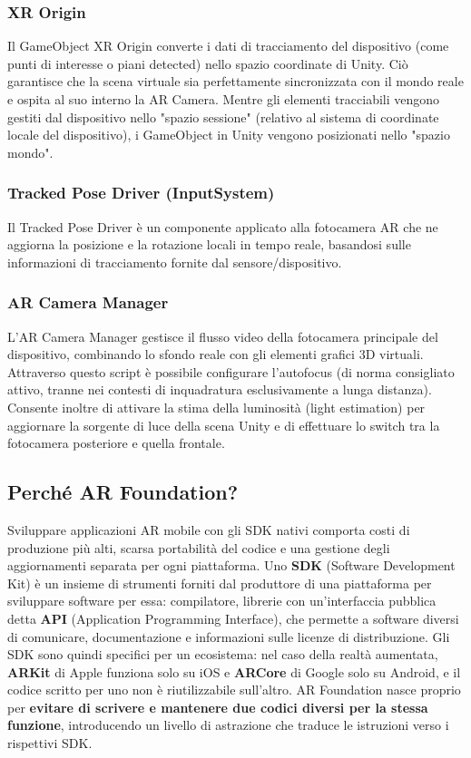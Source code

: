 \subsubsection{XR Origin}
Il GameObject XR Origin converte i dati di tracciamento del dispositivo (come punti di interesse o piani detected) nello spazio coordinate di Unity. Ciò garantisce che la scena virtuale sia perfettamente sincronizzata con il mondo reale e ospita al suo interno la AR Camera.
Mentre gli elementi tracciabili vengono gestiti dal dispositivo nello "spazio sessione" (relativo al sistema di coordinate locale del dispositivo), i GameObject in Unity vengono posizionati nello "spazio mondo".

\subsubsection{Tracked Pose Driver (InputSystem)}
Il Tracked Pose Driver è un componente applicato alla fotocamera AR che ne aggiorna la posizione e la rotazione locali in tempo reale, basandosi sulle informazioni di tracciamento fornite dal sensore/dispositivo.

\subsubsection{AR Camera Manager}
L'AR Camera Manager gestisce il flusso video della fotocamera principale del dispositivo, combinando lo sfondo reale con gli elementi grafici 3D virtuali. Attraverso questo script è possibile configurare l'autofocus (di norma consigliato attivo, tranne nei contesti di inquadratura esclusivamente a lunga distanza).
Consente inoltre di attivare la stima della luminosità (light estimation) per aggiornare la sorgente di luce della scena Unity e di effettuare lo switch tra la fotocamera posteriore e quella frontale.


\subsection{Perché AR Foundation?}

Sviluppare applicazioni AR mobile con gli SDK nativi comporta costi di produzione più alti, scarsa portabilità del codice e una gestione degli aggiornamenti separata per ogni piattaforma. Uno \textbf{SDK} (Software Development Kit)\cite{SDK} è un insieme di strumenti forniti dal produttore di una piattaforma per sviluppare software per essa: compilatore, librerie con un'interfaccia pubblica detta \textbf{API} (Application Programming Interface), che permette a software diversi di comunicare, documentazione e informazioni sulle licenze di distribuzione. Gli SDK sono quindi specifici per un ecosistema: nel caso della realtà aumentata, \textbf{ARKit} di Apple funziona solo su iOS e \textbf{ARCore} di Google solo su Android, e il codice scritto per uno non è riutilizzabile sull'altro. AR Foundation nasce proprio per \textbf{evitare di scrivere e mantenere due codici diversi per la stessa funzione}, introducendo un livello di astrazione che traduce le istruzioni verso i rispettivi SDK.

